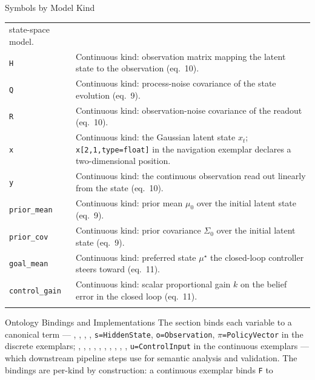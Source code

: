 \documentclass[
  ignorenonframetext,
]{beamer}
\begin{document}
\begin{frame}{Symbols by Model Kind}
\begin{longtable}[]{@{}
  >{\raggedright\arraybackslash}p{}
  >{\raggedright\arraybackslash}p{}@{}}
state-space model. \\
\texttt{H} & Continuous kind: observation matrix mapping the latent
state to the observation (eq.~10). \\
\texttt{Q} & Continuous kind: process-noise covariance of the state
evolution (eq.~9). \\
\texttt{R} & Continuous kind: observation-noise covariance of the
readout (eq.~10). \\
\texttt{x} & Continuous kind: the Gaussian latent state \(x_t\);
\texttt{x{[}2,1,type=float{]}} in the navigation exemplar declares a
two-dimensional position. \\
\texttt{y} & Continuous kind: the continuous observation read out
linearly from the state (eq.~10). \\
\texttt{prior\_mean} & Continuous kind: prior mean \(\mu_0\) over the
initial latent state (eq.~9). \\
\texttt{prior\_cov} & Continuous kind: prior covariance \(\Sigma_0\)
over the initial latent state (eq.~9). \\
\texttt{goal\_mean} & Continuous kind: preferred state \(\mu^\star\) the
closed-loop controller steers toward (eq.~11). \\
\texttt{control\_gain} & Continuous kind: scalar proportional gain \(k\)
on the belief error in the closed loop (eq.~11). \\
\bottomrule\noalign{}
\end{longtable}
\end{frame}

\begin{frame}{Ontology Bindings and
Implementations}
\protect{}\label{ontology-bindings-and-implementations}
The  section binds each variable
to a canonical term --- ,
, ,
, \texttt{s=HiddenState},
\texttt{o=Observation}, \texttt{\texorpdfstring{\ensuremath{\pi}}{pi}=PolicyVector} in the discrete
exemplars; ,
, ,
, ,
, ,
, ,
, \texttt{u=ControlInput} in the
continuous exemplars --- which downstream pipeline steps use for
semantic analysis and validation. The bindings are per-kind by
construction: a continuous exemplar binds \texttt{F} to
\end{frame}
\end{document}
